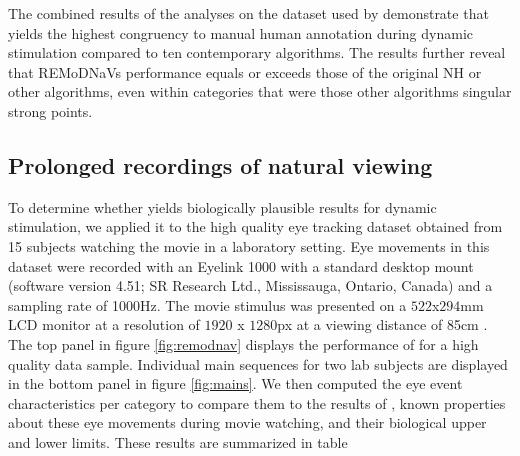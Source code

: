 The combined results of the analyses on the dataset used by \citet{Andersson2017} demonstrate that \remodnav yields the highest congruency to manual human annotation during dynamic stimulation compared to ten contemporary algorithms. The results further reveal that REMoDNaVs performance equals or exceeds those of the original NH or other algorithms, even within categories that were those other algorithms singular strong points.





\subsection*{Prolonged recordings of natural viewing}\label{ana_2}


To determine whether \remodnav yields biologically plausible results for dynamic stimulation, we applied it to the high quality eye tracking dataset obtained from 15 subjects watching the movie in a laboratory setting. Eye movements in this dataset were recorded with an Eyelink 1000 with a standard desktop mount (software version 4.51; SR Research Ltd., Mississauga, Ontario, Canada) and a sampling rate of 1000Hz. The movie stimulus was presented on a $522$x$294$mm LCD monitor at a resolution of $1920$ x $1280$px at a viewing distance of 85cm \citep{Hanke2016}. The top panel in figure \ref{fig:remodnav} displays the performance of \remodnav for a high quality data sample. Individual main sequences for two lab subjects are displayed in the bottom panel in figure \ref{fig:mains}. We then computed the eye event characteristics per category to compare them to the results of \cite{Andersson2017}, known properties about these eye movements during movie watching, and their biological upper and lower limits. These results are summarized in table  



